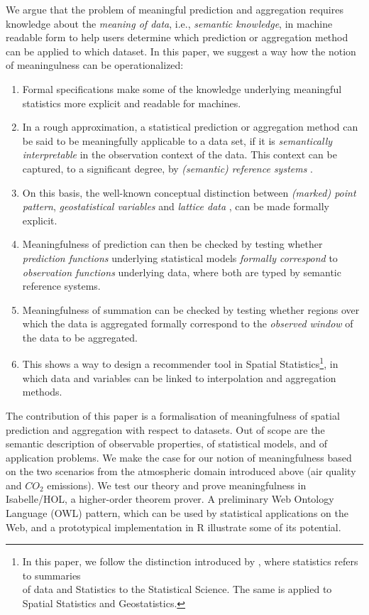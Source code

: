 \documentclass[final,authoryear,1p,times]{elsarticle}
\begin{document}
We argue that the problem of meaningful prediction and aggregation requires knowledge about the \textit{meaning of data}, i.e., \textit{semantic knowledge}, in machine readable form to help users determine which prediction or aggregation method can be applied to which dataset. In this paper, we suggest a way how the notion of meaningulness can be operationalized:
\begin{enumerate}
\item Formal specifications make some of the knowledge underlying meaningful statistics more explicit and readable for machines.
\item In a rough approximation, a statistical prediction or aggregation method can be said to be meaningfully applicable to a data set, if it is \textit{semantically interpretable} in the observation context of the data. This context can be captured, to a significant degree, by \textit{(semantic) reference systems} \citep{Kuhn2003}.
\item On this basis, the well-known conceptual distinction between \textit{(marked) point pattern}, \textit{geostatistical variables} and \textit{lattice data} \citep{Illian2008,Burrough1998,Cressie2011}, can be made formally explicit.
	\item Meaningfulness of prediction can then be checked by testing whether \textit{prediction functions} underlying statistical models \textit{formally correspond} to \textit{observation functions} underlying data, where both are typed by semantic reference systems.
	\item Meaningfulness of summation can be checked by testing whether regions over which the data is aggregated formally correspond to the \textit{observed window} of the data to be aggregated.	
	\item This shows a way to design a recommender tool in Spatial Statistics\footnote{In this paper, we follow the distinction introduced by \citep{Cressie2011}, where statistics refers to summaries\\ of data and Statistics to the Statistical Science. The same is applied to Spatial Statistics and Geostatistics.}, in which data and variables can be linked to interpolation and aggregation methods. 
\end{enumerate}

The contribution of this paper is a formalisation of meaningfulness of spatial prediction and aggregation with respect to datasets. Out of scope are the semantic description of observable properties, of statistical models, and of application problems. We make the case for our notion of meaningfulness based on the two scenarios from the atmospheric domain introduced above (air quality and $CO_2$ emissions). We test our theory and prove meaningfulness in Isabelle/HOL, a higher-order theorem prover. A preliminary Web Ontology Language (OWL) pattern, which can be used by statistical applications on the Web, and a prototypical implementation in R illustrate some of its potential.
\end{document}
